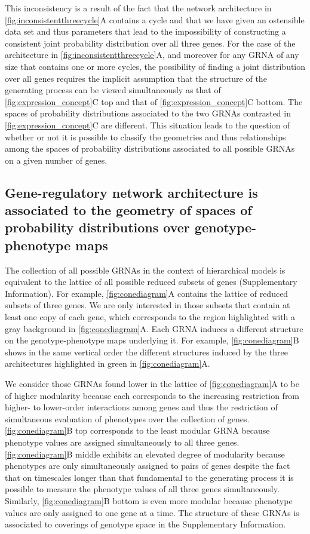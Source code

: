 This inconsistency is a result of the fact that the network architecture in \ref{fig:inconsistentthreecycle}A contains a cycle \cite{Lauritzen1996,Geiger2006,Wainwright2007} and that we have given an ostensible data set and thus parameters that lead to the impossibility of constructing a consistent joint probability distribution over all three genes. For the case of the architecture in \ref{fig:inconsistentthreecycle}A, and moreover for any GRNA of any size that contains one or more cycles, the possibility of finding a joint distribution over all genes requires the implicit assumption that the structure of the generating process can be viewed simultaneously as that of \ref{fig:expression_concept}C top and that of \ref{fig:expression_concept}C bottom. The spaces of probability distributions associated to the two GRNAs contrasted in \ref{fig:expression_concept}C are different. This situation leads to the question of whether or not it is possible to classify the geometries and thus relationships among the spaces of probability distributions associated to all possible GRNAs on a given number of genes.

\subsection{Gene-regulatory network architecture is associated to the geometry of spaces of probability distributions over genotype-phenotype maps}
The collection of all possible GRNAs in the context of hierarchical models is equivalent to the lattice of all possible reduced subsets of genes (Supplementary Information). For example, \ref{fig:conediagram}A contains the lattice of reduced subsets of three genes. We are only interested in those subsets that contain at least one copy of each gene, which corresponds to the region highlighted with a gray background in \ref{fig:conediagram}A. Each GRNA induces a different structure on the genotype-phenotype maps underlying it. For example, \ref{fig:conediagram}B shows in the same vertical order the different structures induced by the three architectures highlighted in green in \ref{fig:conediagram}A.

We consider those GRNAs found lower in the lattice of \ref{fig:conediagram}A to be of higher modularity because each corresponds to the increasing restriction from higher- to lower-order interactions among genes and thus the restriction of simultaneous evaluation of phenotypes over the collection of genes. \ref{fig:conediagram}B top corresponds to the least modular GRNA because phenotype values are assigned simultaneously to all three genes. \ref{fig:conediagram}B middle exhibits an elevated degree of modularity because phenotypes are only simultaneously assigned to pairs of genes despite the fact that on timescales longer than that fundamental to the generating process it is possible to measure the phenotype values of all three genes simultaneously. Similarly, \ref{fig:conediagram}B bottom is even more modular because phenotype values are only assigned to one gene at a time. The structure of these GRNAs is associated to coverings of genotype space in the Supplementary Information.

